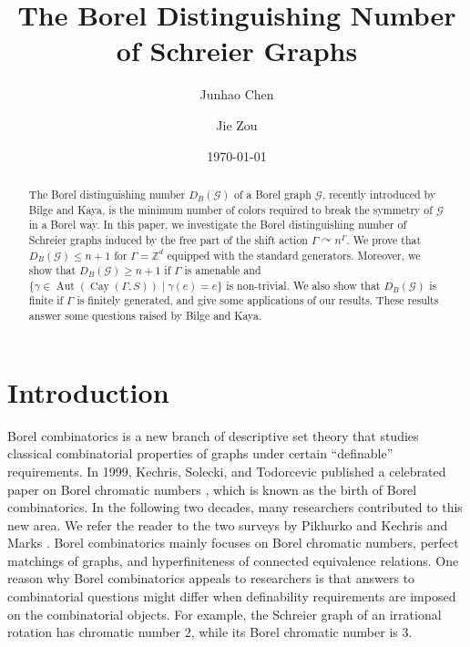 \documentclass[11pt, reqno, a4paper]{amsart}
\title{The Borel Distinguishing Number of Schreier Graphs}
\author{Junhao Chen}
\author{Jie Zou}
\date{\today}
\theoremstyle{plain}
\theoremstyle{definition}
\theoremstyle{remark}
\newcommand{\Aut}{\operatorname{Aut}}
\newcommand{\Cay}{\operatorname{Cay}}
\begin{document}
\begin{abstract}
The Borel distinguishing number $D_B(\mathcal{G})$ of a Borel graph $\mathcal{G}$, recently introduced by Bilge and Kaya, is the minimum number of colors required to break the symmetry of $\mathcal{G}$ in a Borel way. In this paper, we investigate the Borel distinguishing number of Schreier graphs induced by the free part of the shift action $\Gamma \curvearrowright n^\Gamma$. We prove that $D_B(\mathcal{G})\le n+1$ for $\Gamma=\mathbb{Z}^d$ equipped with the standard generators. Moreover, we show that $D_B(\mathcal{G})\ge n+1$ if $\Gamma$ is amenable and  $\{ \gamma \in \Aut(\Cay(\Gamma,S)) \mid \gamma(e) = e \}$ is non-trivial. We also  show that $D_B(\mathcal{G})$ is finite if $\Gamma$ is finitely generated, and give some applications of our results. These results answer some questions raised by Bilge and Kaya.
\end{abstract}

\maketitle

\section{Introduction}
Borel combinatorics is a new branch of descriptive set theory that studies classical combinatorial properties of graphs under certain ``definable'' requirements. In 1999, Kechris, Solecki, and Todorcevic  published a celebrated paper on Borel chromatic numbers \cite{KST99}, which is known as the birth of Borel combinatorics. In the following two decades, many researchers contributed to this new area. We refer the reader to the two surveys by Pikhurko \cite{Pik21} and Kechris and Marks \cite{KM20}. Borel combinatorics mainly focuses on Borel chromatic numbers, perfect matchings of graphs, and hyperfiniteness of connected equivalence relations. One reason why Borel combinatorics appeals to researchers is that answers to combinatorial questions might differ when definability requirements are imposed on the combinatorial objects. For example, the Schreier graph of an irrational rotation has chromatic number $2$, while its Borel chromatic number is $3$.
\end{document}
